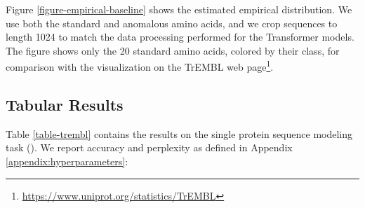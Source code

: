 Figure \ref{figure-empirical-baseline} shows the estimated empirical distribution. We use both the standard and anomalous amino acids, and we crop sequences to length 1024 to match the data processing performed for the Transformer models. The figure shows only the 20 standard amino acids, colored by their class, for comparison with the visualization on the TrEMBL web page\footnote{\url{https://www.uniprot.org/statistics/TrEMBL}}.

\subsection{Tabular Results}

Table \ref{table-trembl} contains the results on the single protein sequence modeling task (). We report accuracy and perplexity as defined in Appendix \ref{appendix:hyperparameters}:

\begin{comment}
We report the following evaluation metrics:
\begin{enumerate}
\item \textbf{Accuracy}: For unidirectional models, we measure the accuracy on next-token prediction, averaged across all sequence positions in the dataset. For bidirectional models, we mask each token with  probability and measure accuracy across the masked positions.
\item \textbf{Perplexity}: For unidirectional models, we measure perplexity across all sequence positions in the dataset. For bidirectional models, similar to the accuracy case, we measure perplexity across the masked positions. \end{enumerate}
\end{comment}

